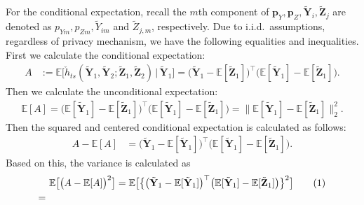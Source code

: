 \documentclass[twoside,11pt]{article}
\newcommand\numberthis{\addtocounter{equation}{1}\tag{\theequation}}
\newcommand{\rvTwo}{Y}
\newcommand{\rvThree}{Z}
\newcommand{\vectorize}[1]{\mathbf{#1}}
\newcommand{\mE}{\mathbb{E}} %
\newcommand{\sampleIndexOne}{i}
\newcommand{\sampleIndexTwo}{j}
\newcommand{\vectorIndex}{m}
\newcommand{\probVecElement}[2]{p_{{#1}{#2}}}
\newcommand{\probVec}{\mathbf{p}} %
\newcommand{\kernelTwoSampleSym}{\check{h}_{ts}}
\begin{document}
\begin{appendix}
\begin{itemize}
	For the conditional expectation, recall
	the $\vectorIndex$th component of
	$\probVec_\rvTwo, \probVec_\rvThree,
	\tilde{\vectorize{\rvTwo}}_{\sampleIndexOne},
	\tilde{\vectorize{\rvThree}}_{\sampleIndexTwo}$
	are denoted as
	$
	\probVecElement{\rvTwo}{\vectorIndex},
	\probVecElement{\rvThree}{\vectorIndex},
	\tilde{\rvTwo}_{\sampleIndexOne \vectorIndex}$
	and $\tilde{\rvThree}_{\sampleIndexTwo, \vectorIndex}$,
	respectively.
	Due to i.i.d.~assumptions, regardless of privacy mechanism, we have the following equalities and inequalities.
	First we calculate the conditional expectation:
	\begin{align*}
		A&:=
		\mE
		\bigl[
		\kernelTwoSampleSym(
		\tilde{\vectorize{\rvTwo}}_1,
		\tilde{\vectorize{\rvTwo}}_2
		;
		\tilde{\vectorize{\rvThree}}_1,
		\tilde{\vectorize{\rvThree}}_2)
		\,|\,
		\tilde{\vectorize{\rvTwo}}_1
		\bigr]
		=
		\bigl(
		\tilde{\vectorize{\rvTwo}}_1 - \mE [ \tilde{\vectorize{\rvThree}}_{1}]
		\bigr)^\top
		\bigl(
		\mE [ \tilde{\vectorize{\rvTwo}}_{1}] - \mE [ \tilde{\vectorize{\rvThree}}_{1}]
		\bigr).
	\end{align*}
	Then we calculate the unconditional expectation:
	\begin{align*}
		\mE[A]
		=
		\bigl(
		\mE [ \tilde{\vectorize{\rvTwo}}_{1}]  - \mE [ \tilde{\vectorize{\rvThree}}_{1}]
		\bigr)^\top
		\bigl(
		\mE [ \tilde{\vectorize{\rvTwo}}_{1}] - \mE [ \tilde{\vectorize{\rvThree}}_{1}]
		\bigr)
		=
		\|\mE [ \tilde{\vectorize{\rvTwo}}_{1}]
		-
		\mE [ \tilde{\vectorize{\rvThree}}_{1}]
		\|_2^2.
	\end{align*}
	Then the squared and centered conditional expectation is calculated as follows:
	\begin{align*}
		A - \mE[A]
		&=
		\bigl(
		\tilde{\vectorize{\rvTwo}}_1 - \mE [ \tilde{\vectorize{\rvTwo}}_{1}]
		\bigr)^\top
		\bigl(
		\mE [ \tilde{\vectorize{\rvTwo}}_{1}] - \mE [ \tilde{\vectorize{\rvThree}}_{1}]
		\bigr).
	\end{align*}
	Based on this, the variance is calculated as
	\begin{align*}
		& \mE
		\bigl[
		\bigl(
		A - \mE[A]
		\bigr)^2
		\bigr]
		=
		\mE
		\bigl[
		\bigl\{
		\bigl(
		\tilde{\vectorize{\rvTwo}}_1 - \mE [ \tilde{\vectorize{\rvTwo}}_{1}]
		\bigr)^\top
		\bigl(
		\mE [ \tilde{\vectorize{\rvTwo}}_{1}] - \mE [ \tilde{\vectorize{\rvThree}}_{1}]
		\bigr)
		\bigr\}^2
		\bigr]
		\numberthis \label{appendix:equation:multinomial:upper:forrappor}
		\\
		= ~ &

\end{align*}
\end{itemize}
\end{appendix}
\end{document}
